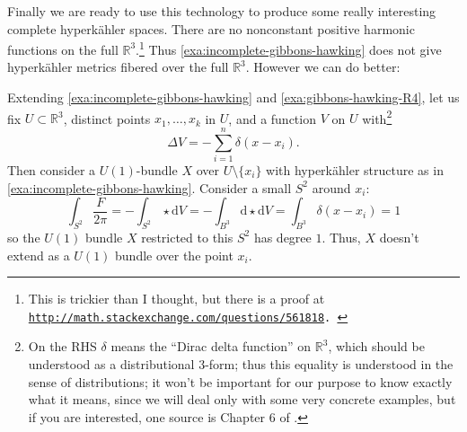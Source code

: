 \documentclass[12pt,letterpaper,reqno]{article}
\numberwithin{equation}{section}
\newcommand{\R}{\ensuremath{\mathbb R}}
\newcommand{\hk}{hyperk\"ahler\xspace}
\newcommand{\de}{\mathrm{d}}
\begin{document}
Finally we are ready to use this technology to
produce some really interesting complete \hk spaces.
There are no
nonconstant positive harmonic functions on the full $\R^3$.\footnote{
This is trickier than I thought, but there is a proof
at \tt\href{http://math.stackexchange.com/questions/561818}{http://math.stackexchange.com/questions/561818}.
}
Thus \autoref{exa:incomplete-gibbons-hawking} does not give
\hk metrics fibered over the full $\R^3$.
However we can do better:

\begin{example} \label{exa:gibbons-hawking}
Extending \autoref{exa:incomplete-gibbons-hawking}
and \autoref{exa:gibbons-hawking-R4},
let us fix $U \subset \R^3$,
distinct points $x_1, \dots, x_k$ in $U$,
and a function $V$ on $U$ with\footnote{On the RHS $\delta$ means
the ``Dirac delta function'' on $\R^3$,
which should be understood
as a distributional 3-form; thus this
equality is understood in the sense
of distributions; it won't be important for our purpose to
know exactly what it means, since we will deal only with
some very concrete examples, but if you are interested,
one source is Chapter 6 of \cite{MR1817225}.}
\begin{equation}
  \Delta V = - \sum_{i=1}^n \delta(x - x_i).
\end{equation}
Then consider a $U(1)$-bundle $X$ over $U \setminus \{x_i\}$
with \hk structure as in \autoref{exa:incomplete-gibbons-hawking}.
Consider a small $S^2$ around $x_i$:
\begin{equation}
  \int_{S^2} \frac{F}{2\pi} = -\int_{S^2} \star \de V = -\int_{B^3} \de \star \de V = \int_{B^3} \delta(x - x_i) = 1
\end{equation}
so the $U(1)$ bundle $X$ restricted to this $S^2$ has
degree $1$. Thus, $X$ doesn't extend as a $U(1)$ bundle
over the point $x_i$.


\end{example}
\end{document}
